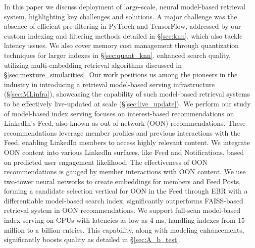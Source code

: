In this paper we discuss deployment of large-scale, neural model-based retrieval system, highlighting key challenges and solutions. A major challenge was the absence of efficient pre-filtering in PyTorch and TensorFlow, addressed by our custom indexing and filtering methods detailed in \S\ref{sec:knn}, which also tackle latency issues. We also cover memory cost management through quantization techniques for larger indexes in \S\ref{sec:quant_knn}. {\systemname} enhanced search quality, utilizing multi-embedding retrieval algorithms discussed in \S\ref{sec:mexture_similarities}. Our work positions us among the pioneers in the industry in introducing a retrieval model-based serving infrastructure (\S\ref{sec:MLinfra}), showcasing the capability of such model-based retrieval systems to be effectively live-updated at scale (\S\ref{sec:live_update}). We perform our study of model-based index serving focuses on interest-based recommendations on LinkedIn's Feed, also known as out-of-network (OON) recommendations. These recommendations leverage member profiles and previous interactions with the Feed, enabling LinkedIn members to access highly relevant content. We integrate OON content into various LinkedIn surfaces, like Feed and Notifications, based on predicted user engagement likelihood. The effectiveness of OON recommendations is gauged by member interactions with OON content. We use two-tower neural networks to create embeddings for members and Feed Posts, forming a candidate selection vertical for OON in the Feed through EBR with a differentiable model-based search index. {\systemname} significantly outperforms FAISS-based~\cite{FAISS_paper} retrieval system in OON recommendations. We support full-scan model-based index serving on GPUs with latencies as low as 4 ms, handling indexes from 15 million to a billion entries. This capability, along with modeling enhancements, significantly boosts quality as detailed in \S\ref{sec:A_b_test}.